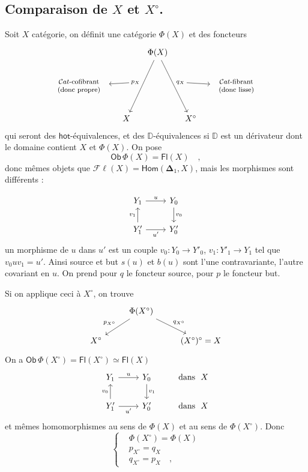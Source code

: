 \documentclass[11pt,leqno]{article}
\newcommand{\msp}[1]{\marginpar{\footnotesize [#1]}}
\newcommand{\Ob}{\mathsf{Ob}}
\newcommand{\Hom}{\mathsf{Hom}}
\newcommand{\hot}{\mathsf{hot}}
\newcommand{\D}{\mathbb{D}}
\newcommand{\Fl}{\mathsf{Fl}}
\newcommand{\Cat}{\mathcal{C}at}
\begin{document}
\subsection*{Comparaison de $X$ et $X^{\circ}$.}

Soit $X$ catégorie, on définit une catégorie $\Phi(X)$ et des foncteurs
\[
\begin{tikzcd}[column sep=small]
& & \Phi(X) \arrow[ddl, "p_X"{swap, name=P}] \arrow[ddr, "q_X"{name=Q}] & & \\
|[alias=L]| \text{\footnotesize\begin{tabular}{c}$\Cat$-cofibrant\\(donc propre)\end{tabular}} & & & & |[alias=R]| \text{\footnotesize\begin{tabular}{c}$\Cat$-fibrant\\(donc lisse)\\ \end{tabular}} \\
& X & & X^{\circ} &
\arrow[from=P, to=L]
\arrow[from=Q, to=R]
\end{tikzcd}
\]
qui seront des $\hot$-équivalences, et des $\D$-équivalences si $\D$ est un dérivateur dont le domaine contient $X$ et $\Phi(X)$. On pose
\[
\Ob\, \Phi(X) = \Fl(X) \quad ,
\]
donc mêmes objets que $\mathcal{F}\ell(X) = \Hom(\boldsymbol{\Delta}_1, X)$, mais les morphismes sont différents :

\msp{page 73}
\[
\begin{tikzcd}
Y_1 \arrow[r, "u"] & Y_0 \arrow[d, "v_0"] \\
Y'_1 \arrow[u, "v_1"] \arrow[r, "u'"{swap}] & Y'_0
\end{tikzcd}
\]
un morphisme de $u$ dans $u'$ est un couple $v_0 : Y_0 \to Y'_0$, $v_1 : Y'_1 \to Y_1$ tel que $v_0uv_1 = u'$. Ainsi source et but $s(u)$ et $b(u)$ sont l'une contravariante, l'autre covariant en $u$. On prend pour $q$ le foncteur source, pour $p$ le foncteur but. %

Si on applique ceci à $X^{\circ}$, on trouve
\[
\begin{tikzcd}
& \Phi(X^{\circ}) \arrow[dl, "p_{X^{\circ}}"{swap}] \arrow[dr, "q_{X^{\circ}}"] & \\
X^{\circ} & & (X^{\circ})^{\circ} = X
\end{tikzcd}
\]
On a $\Ob\, \Phi(X^{\circ}) = \Fl(X^{\circ}) \simeq \Fl(X)$
\[
\begin{tikzcd}
Y_1 \arrow[r, "u"] & Y_0 \arrow[d, "v_1"] & \text{dans}\ \ X \\
Y'_1 \arrow[u, "v_0"] \arrow[r, "u'"{swap}] & Y'_0 & \text{dans}\ \ X
\end{tikzcd}
\]
et mêmes homomorphismes au sens de $\Phi(X)$ et au sens de $\Phi(X^{\circ})$. Donc
\[
\left\{
\begin{aligned}
&\Phi(X^{\circ}) = \Phi(X) \\
&p_{X^{\circ}} = q_X \\
&q_{X^{\circ}} = p_X \quad ,
\end{aligned}
\right.
\]
\end{document}
